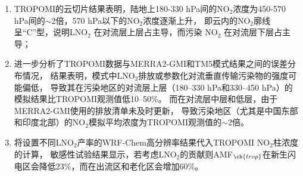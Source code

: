 \begin{enumerate}[label=（\arabic*）, labelindent=\parindent, leftmargin=0pt, widest=0, itemindent=*, topsep=0pt, partopsep=0pt, parsep=0pt]

\item TROPOMI的云切片结果表明，陆地上180-330 hPa间的NO$_2$浓度为450-570 hPa间的$\sim$2倍，570 hPa以下的NO$_2$浓度逐渐上升，
即云内的NO$_2$廓线呈“C”型，说明LNO$_2$ 在对流层上层占主导，而污染 NO$_2$ 在对流层下层占主导；

\item 进一步分析了TROPOMI数据与MERRA2-GMI和TM5模式结果之间的误差分布情况，
结果表明，模式中LNO$_2$排放或参数化对流垂直传输污染物的强度可能偏低，
导致其在污染地区的对流层上层（180--330 hPa和330--450 hPa）的模拟结果比TROPOMI观测值低10--50\%。
而在对流层中层和低层，由于MERRA2-GMI使用的排放清单未及时更新，
导致污染地区（尤其是中国东部和印度北部）的NO$_2$模拟平均浓度为TROPOMI观测值的$\sim$2倍。

\item 将设置不同LNO$_2$产率的WRF-Chem高分辨率结果代入TROPOMI NO$_2$柱浓度的计算，
敏感性试验结果显示，若考虑LNO$_2$的贡献则AMF$_{\ch{trop}}$在新生闪电区会降低23\%，而在出流区和老化区会增加60\%。

\end{enumerate}
